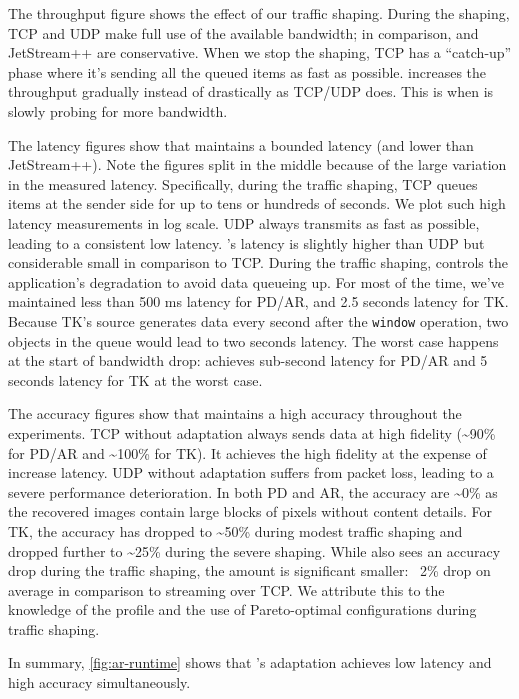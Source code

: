 The throughput figure shows the effect of our traffic shaping. During the
shaping, TCP and UDP make full use of the available bandwidth; in comparison,
\sysname{} and JetStream++ are conservative. When we stop the shaping, TCP has a
``catch-up'' phase where it's sending all the queued items as fast as
possible. \sysname{} increases the throughput gradually instead of drastically
as TCP/UDP does. This is when \sysname{} is slowly probing for more bandwidth.

The latency figures show that \sysname{} maintains a bounded latency (and lower
than JetStream++). Note the figures split in the middle because of the large
variation in the measured latency. Specifically, during the traffic shaping, TCP
queues items at the sender side for up to tens or hundreds of seconds. We plot
such high latency measurements in log scale. UDP always transmits as fast as
possible, leading to a consistent low latency. \sysname{}'s latency is slightly
higher than UDP but considerable small in comparison to TCP\@. During the
traffic shaping, \sysname{} controls the application's degradation to avoid data
queueing up. For most of the time, we've maintained less than 500 ms latency for
PD/AR, and 2.5 seconds latency for TK\@. Because TK's source generates data
every second after the \texttt{window} operation, two objects in the queue would
lead to two seconds latency. The worst case happens at the start of bandwidth
drop: \sysname{} achieves sub-second latency for PD/AR and 5 seconds latency for
TK at the worst case.

The accuracy figures show that \sysname{} maintains a high accuracy throughout
the experiments. TCP without adaptation always sends data at high fidelity
(\textasciitilde 90\% for PD/AR and \textasciitilde 100\% for TK). It achieves
the high fidelity at the expense of increase latency. UDP without adaptation
suffers from packet loss, leading to a severe performance deterioration.  In
both PD and AR, the accuracy are \textasciitilde 0\% as the recovered images
contain large blocks of pixels without content details. For TK, the accuracy has
dropped to \textasciitilde 50\% during modest traffic shaping and dropped
further to \textasciitilde 25\% during the severe shaping. While \sysname{} also
sees an accuracy drop during the traffic shaping, the amount is significant
smaller: ~2\% drop on average in comparison to streaming over TCP\@.
We attribute this to the knowledge of the profile and the use of Pareto-optimal configurations during traffic shaping.

In summary, \autoref{fig:ar-runtime} shows that \sysname{}'s adaptation achieves
low latency and high accuracy simultaneously.

